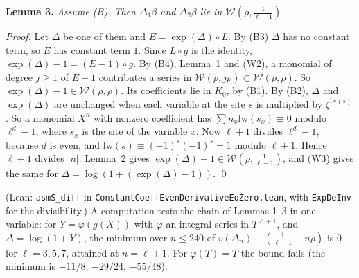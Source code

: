 \documentclass[11pt,letterpaper]{article}
\begin{document}
\textbf{Lemma 3.} \emph{Assume \textup{(B)}. Then $\Delta_1\beta$ and $\Delta_2\beta$ lie in
$\mathcal W(\rho,\frac1{\ell-1})$.}

\emph{Proof.} Let $\Delta$ be one of them and $E=\exp(\Delta)\circ L$. By (B3) $\Delta$ has no constant
term, so $E$ has constant term $1$. Since $L\circ g$ is the identity, $\exp(\Delta)-1=(E-1)\circ g$. By
(B4), Lemma~1 and (W2), a monomial of degree $j\ge1$ of $E-1$ contributes a series in
$\mathcal W(\rho,j\rho)\subset\mathcal W(\rho,\rho)$. So $\exp(\Delta)-1\in\mathcal W(\rho,\rho)$. Its
coefficients lie in $K_0$, by (B1). By (B2), $\Delta$ and $\exp(\Delta)$ are unchanged when each variable at
the site $s$ is multiplied by $\zeta^{\mathrm{lw}(s)}$. So a monomial $X^n$ with nonzero coefficient has
$\sum n_x\mathrm{lw}(s_x)\equiv0$ modulo $\ell^d-1$, where $s_x$ is the site of the variable $x$. Now $\ell+1$
divides $\ell^d-1$, because $d$ is even, and $\mathrm{lw}(s)\equiv(-1)^s(-1)^s=1$ modulo $\ell+1$. Hence $\ell+1$
divides $|n|$. Lemma~2 gives $\exp(\Delta)-1\in\mathcal W(\rho,\frac1{\ell-1})$, and (W3) gives the same
for $\Delta=\log(1+(\exp(\Delta)-1))$. \qed

\noindent (Lean: \texttt{asmS\_diff} in \texttt{ConstantCoeffEvenDerivativeEqZero.lean}, with
\texttt{ExpDeInv} for the divisibility.) A computation tests the chain of Lemmas 1--3 in one
variable: for $Y=\varphi(g(X))$ with $\varphi$ an integral series in $T^{\ell+1}$, and $\Delta=\log(1+Y)$,
the minimum over $n\le240$ of $v(\Delta_n)-(\frac1{\ell-1}-n\rho)$ is $0$ for $\ell=3,5,7$, attained at
$n=\ell+1$. For $\varphi(T)=T$ the bound fails (the minimum is $-11/8$, $-29/24$, $-55/48$).
\end{document}
